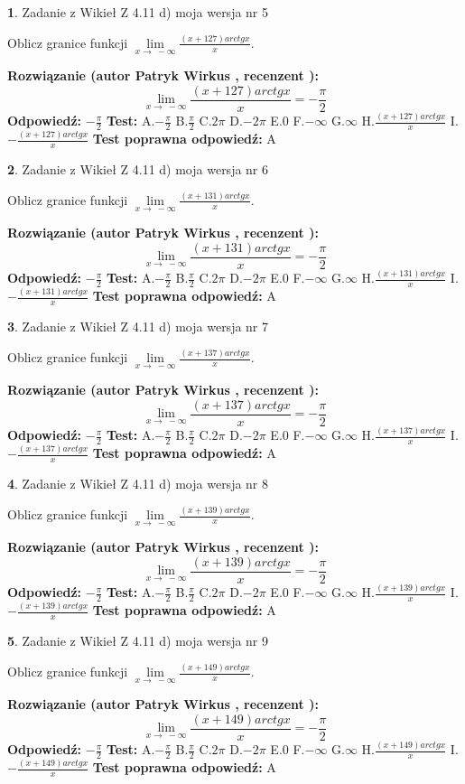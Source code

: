 \documentclass[12pt, a4paper]{article}
\theoremstyle{definition} %
\newtheorem{zad}{}
\newcommand{\zadStart}[1]{\begin{zad}#1\newline}
\newcommand{\zadStop}{\end{zad}}
\newcommand{\rozwStart}[2]{\noindent \textbf{Rozwiązanie (autor #1 , recenzent #2): }\newline}
\newcommand{\rozwStop}{\newline}
\newcommand{\odpStart}{\noindent \textbf{Odpowiedź:}\newline}
\newcommand{\odpStop}{\newline}
\newcommand{\testStart}{\noindent \textbf{Test:}\newline}
\newcommand{\testStop}{\newline}
\newcommand{\kluczStart}{\noindent \textbf{Test poprawna odpowiedź:}\newline}
\newcommand{\kluczStop}{\newline}
\begin{document}
\zadStart{Zadanie z Wikieł Z 4.11 d) moja wersja nr 5}

Oblicz granice funkcji $\lim\limits_{x\to\ -\infty}\frac{(x+127)arctgx}{x}$.
\zadStop
\rozwStart{Patryk Wirkus}{}
$$\lim\limits_{x\to\ -\infty}\frac{(x+127)arctgx}{x} = -\frac{\pi}{2}$$
\rozwStop
\odpStart
$-\frac{\pi}{2}$
\odpStop
\testStart
A.$-\frac{\pi}{2}$ B.$\frac{\pi}{2}$ C.$2\pi$ D.$-2\pi$ E.$0$ F.$-\infty$ G.$\infty$ H.$\frac{(x+127)arctgx}{x}$ I.$-\frac{(x+127)arctgx}{x}$
\testStop
\kluczStart
A
\kluczStop



\zadStart{Zadanie z Wikieł Z 4.11 d) moja wersja nr 6}

Oblicz granice funkcji $\lim\limits_{x\to\ -\infty}\frac{(x+131)arctgx}{x}$.
\zadStop
\rozwStart{Patryk Wirkus}{}
$$\lim\limits_{x\to\ -\infty}\frac{(x+131)arctgx}{x} = -\frac{\pi}{2}$$
\rozwStop
\odpStart
$-\frac{\pi}{2}$
\odpStop
\testStart
A.$-\frac{\pi}{2}$ B.$\frac{\pi}{2}$ C.$2\pi$ D.$-2\pi$ E.$0$ F.$-\infty$ G.$\infty$ H.$\frac{(x+131)arctgx}{x}$ I.$-\frac{(x+131)arctgx}{x}$
\testStop
\kluczStart
A
\kluczStop



\zadStart{Zadanie z Wikieł Z 4.11 d) moja wersja nr 7}

Oblicz granice funkcji $\lim\limits_{x\to\ -\infty}\frac{(x+137)arctgx}{x}$.
\zadStop
\rozwStart{Patryk Wirkus}{}
$$\lim\limits_{x\to\ -\infty}\frac{(x+137)arctgx}{x} = -\frac{\pi}{2}$$
\rozwStop
\odpStart
$-\frac{\pi}{2}$
\odpStop
\testStart
A.$-\frac{\pi}{2}$ B.$\frac{\pi}{2}$ C.$2\pi$ D.$-2\pi$ E.$0$ F.$-\infty$ G.$\infty$ H.$\frac{(x+137)arctgx}{x}$ I.$-\frac{(x+137)arctgx}{x}$
\testStop
\kluczStart
A
\kluczStop



\zadStart{Zadanie z Wikieł Z 4.11 d) moja wersja nr 8}

Oblicz granice funkcji $\lim\limits_{x\to\ -\infty}\frac{(x+139)arctgx}{x}$.
\zadStop
\rozwStart{Patryk Wirkus}{}
$$\lim\limits_{x\to\ -\infty}\frac{(x+139)arctgx}{x} = -\frac{\pi}{2}$$
\rozwStop
\odpStart
$-\frac{\pi}{2}$
\odpStop
\testStart
A.$-\frac{\pi}{2}$ B.$\frac{\pi}{2}$ C.$2\pi$ D.$-2\pi$ E.$0$ F.$-\infty$ G.$\infty$ H.$\frac{(x+139)arctgx}{x}$ I.$-\frac{(x+139)arctgx}{x}$
\testStop
\kluczStart
A
\kluczStop



\zadStart{Zadanie z Wikieł Z 4.11 d) moja wersja nr 9}

Oblicz granice funkcji $\lim\limits_{x\to\ -\infty}\frac{(x+149)arctgx}{x}$.
\zadStop
\rozwStart{Patryk Wirkus}{}
$$\lim\limits_{x\to\ -\infty}\frac{(x+149)arctgx}{x} = -\frac{\pi}{2}$$
\rozwStop
\odpStart
$-\frac{\pi}{2}$
\odpStop
\testStart
A.$-\frac{\pi}{2}$ B.$\frac{\pi}{2}$ C.$2\pi$ D.$-2\pi$ E.$0$ F.$-\infty$ G.$\infty$ H.$\frac{(x+149)arctgx}{x}$ I.$-\frac{(x+149)arctgx}{x}$
\testStop
\kluczStart
A
\kluczStop
\end{document}
